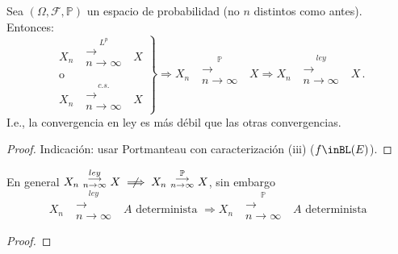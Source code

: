 \begin{proposition}
Sea $(\Omega,\mathcal{F},\mathbb{P})$ un espacio de probabilidad (no $n$ distintos como antes). Entonces:
$$\left.\begin{aligned}
X_n\mbox{ }\overset{L^p}{\substack{\longrightarrow \\n \to \infty}}\mbox{ }X \\ \mbox{o} \hspace{1cm} \\
X_n\mbox{ }\overset{c.s.}{\substack{\longrightarrow \\n \to \infty}}\mbox{ }X
\end{aligned}\right\} \Longrightarrow X_n\mbox{ }\overset{\mathbb{P}}{\substack{\longrightarrow \\n \to \infty}}\mbox{ }X \Longrightarrow X_n\mbox{ }\overset{ley}{\substack{\longrightarrow \\n \to \infty}}\mbox{ }X \, .$$
I.e., la convergencia en ley es más débil que las otras convergencias.
\end{proposition}
\begin{proof}
\ejercicio \gris

Indicación: usar Portmanteau con caracterización (iii) ($f\inBL(E)$). \negro
\end{proof}

\begin{remark}
En general $X_n\mbox{ }\overset{ley}{\substack{\longrightarrow \\n \to \infty}}\mbox{ }X \centernot\implies X_n\mbox{ }\overset{\mathbb{P}}{\substack{\longrightarrow \\n \to \infty}}\mbox{ }X$, sin embargo
$$ X_n\mbox{ }\overset{ley}{\substack{\longrightarrow \\n \to \infty}}\mbox{ }A \mbox{ determinista } \Longrightarrow X_n\mbox{ }\overset{\mathbb{P}}{\substack{\longrightarrow \\n \to \infty}}\mbox{ }A \mbox{ determinista }$$
\end{remark}
\begin{proof}
\ejercicio
\end{proof}

